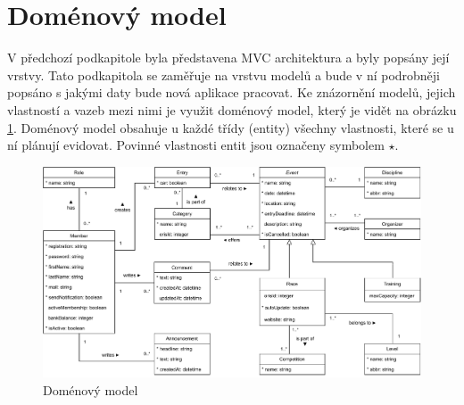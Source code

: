 \section{Doménový model}
V předchozí podkapitole byla představena MVC architektura a byly popsány její vrstvy. Tato podkapitola se zaměřuje na vrstvu modelů a bude v ní podrobněji popsáno s jakými daty bude nová aplikace pracovat. Ke znázornění modelů, jejich vlastností a vazeb mezi nimi je využit doménový model, který je vidět na obrázku \ref{figure:domain-model}. Doménový model obsahuje u každé třídy (entity) všechny vlastnosti, které se u ní plánují evidovat. Povinné vlastnosti entit jsou označeny symbolem $ \star $.

\begin{landscape}
	\begin{figure}[h]
		\caption{Doménový model}
		\label{figure:domain-model}
		\centering
		\includegraphics[width=0.9\linewidth]{images/domain-model.pdf}
	\end{figure}
\end{landscape}
